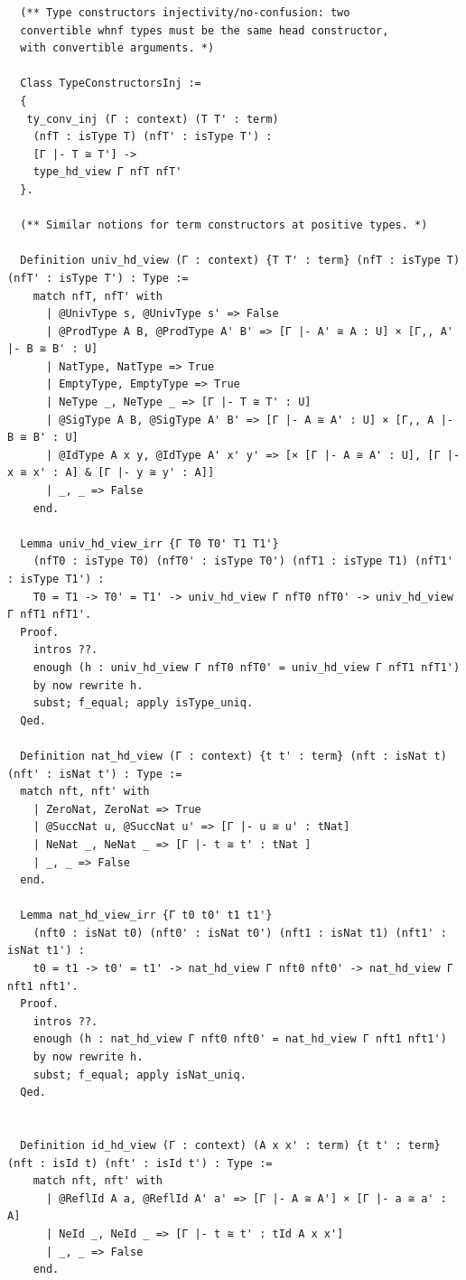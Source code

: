 \documentclass[10pt,a4paper]{amsart}
\begin{document}
\begin{lstlisting}
  (** Type constructors injectivity/no-confusion: two
  convertible whnf types must be the same head constructor,
  with convertible arguments. *)

  Class TypeConstructorsInj :=
  {
   ty_conv_inj (Γ : context) (T T' : term)
    (nfT : isType T) (nfT' : isType T') :
    [Γ |- T ≅ T'] ->
    type_hd_view Γ nfT nfT'
  }.

  (** Similar notions for term constructors at positive types. *)

  Definition univ_hd_view (Γ : context) {T T' : term} (nfT : isType T) (nfT' : isType T') : Type :=
    match nfT, nfT' with
      | @UnivType s, @UnivType s' => False
      | @ProdType A B, @ProdType A' B' => [Γ |- A' ≅ A : U] × [Γ,, A' |- B ≅ B' : U]
      | NatType, NatType => True
      | EmptyType, EmptyType => True
      | NeType _, NeType _ => [Γ |- T ≅ T' : U]
      | @SigType A B, @SigType A' B' => [Γ |- A ≅ A' : U] × [Γ,, A |- B ≅ B' : U]
      | @IdType A x y, @IdType A' x' y' => [× [Γ |- A ≅ A' : U], [Γ |- x ≅ x' : A] & [Γ |- y ≅ y' : A]]
      | _, _ => False
    end.

  Lemma univ_hd_view_irr {Γ T0 T0' T1 T1'}
    (nfT0 : isType T0) (nfT0' : isType T0') (nfT1 : isType T1) (nfT1' : isType T1') :
    T0 = T1 -> T0' = T1' -> univ_hd_view Γ nfT0 nfT0' -> univ_hd_view Γ nfT1 nfT1'.
  Proof.
    intros ??.
    enough (h : univ_hd_view Γ nfT0 nfT0' = univ_hd_view Γ nfT1 nfT1')
    by now rewrite h.
    subst; f_equal; apply isType_uniq.
  Qed.

  Definition nat_hd_view (Γ : context) {t t' : term} (nft : isNat t) (nft' : isNat t') : Type :=
  match nft, nft' with
    | ZeroNat, ZeroNat => True
    | @SuccNat u, @SuccNat u' => [Γ |- u ≅ u' : tNat]
    | NeNat _, NeNat _ => [Γ |- t ≅ t' : tNat ]
    | _, _ => False
  end.

  Lemma nat_hd_view_irr {Γ t0 t0' t1 t1'}
    (nft0 : isNat t0) (nft0' : isNat t0') (nft1 : isNat t1) (nft1' : isNat t1') :
    t0 = t1 -> t0' = t1' -> nat_hd_view Γ nft0 nft0' -> nat_hd_view Γ nft1 nft1'.
  Proof.
    intros ??.
    enough (h : nat_hd_view Γ nft0 nft0' = nat_hd_view Γ nft1 nft1')
    by now rewrite h.
    subst; f_equal; apply isNat_uniq.
  Qed.


  Definition id_hd_view (Γ : context) (A x x' : term) {t t' : term} (nft : isId t) (nft' : isId t') : Type :=
    match nft, nft' with
      | @ReflId A a, @ReflId A' a' => [Γ |- A ≅ A'] × [Γ |- a ≅ a' : A]
      | NeId _, NeId _ => [Γ |- t ≅ t' : tId A x x']
      | _, _ => False
    end.


\end{lstlisting}
\end{document}
